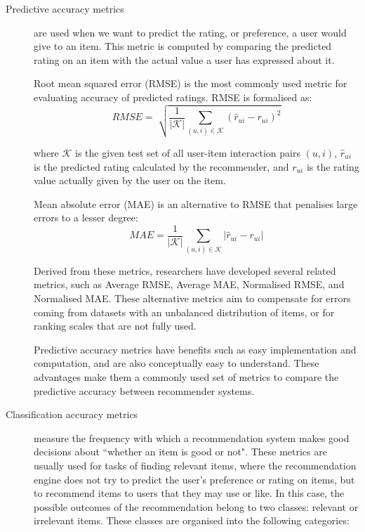 	\begin{description}
		\item [Predictive accuracy metrics] are used when we want to predict the rating, or preference, a user would give to an item. This metric is computed by comparing the predicted rating on an item with the actual value a user has expressed about it. 
        
Root mean squared error (RMSE) is the most commonly used metric for evaluating accuracy of predicted ratings. RMSE is formalised as:
		\begin{equation}\label{eq:rmse} 
			RMSE= \sqrt[]{\frac{1}{|\mathcal{K}|}\displaystyle\sum_{(u,i) \in \mathcal{K}}(\hat{r}_{ui} - r_{ui})^2}
		\end{equation}

		where $\mathcal{K}$ is the given test set of all user-item interaction pairs $(u,i)$, $\hat{r}_{ui}$ is the predicted rating calculated by the recommender, and $r_{ui}$ is the rating value actually given by the user on the item. 
        
Mean absolute error (MAE) is an alternative to RMSE that penalises large errors to a lesser degree:
		\begin{equation}\label{eq:mae} 
			MAE = \frac{1}{|\mathcal{K}|}\displaystyle\sum_{(u,i) \in \mathcal{K}}|\hat{r}_{ui} - r_{ui}|
		\end{equation}

Derived from these metrics, researchers have developed several related metrics, such as Average RMSE, Average MAE, Normalised RMSE, and Normalised MAE. These alternative metrics aim to compensate for errors coming from datasets with an unbalanced distribution of items, or for ranking scales that are not fully used.

Predictive accuracy metrics have benefits such as easy implementation and computation, and are also conceptually easy to understand. These advantages make them a commonly used set of metrics to compare the predictive accuracy between recommender systems. 


		\item [Classification accuracy metrics] measure the frequency with which a recommendation system makes good decisions about ``whether an item is good or not". These metrics are usually used for tasks of finding relevant items, where the recommendation engine does not try to predict the user's preference or rating on items, but to recommend items to users that they may use or like. In this case, the possible outcomes of the recommendation belong to two classes: relevant or irrelevant items. These classes are organised into the following categories:


\end{description}
